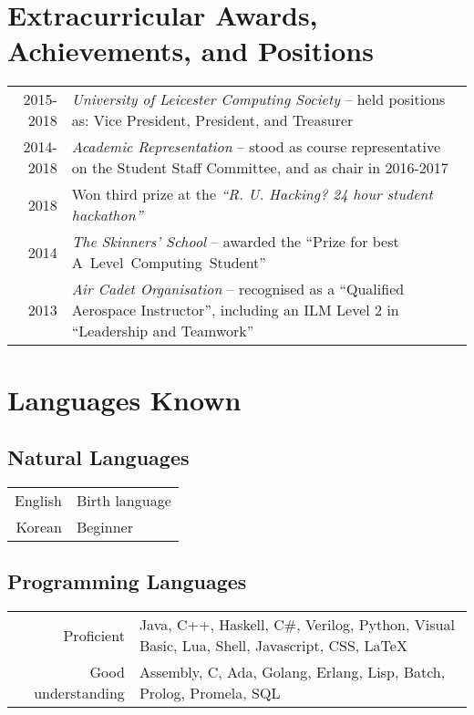 \documentclass[a4paper]{article}
\begin{document}
\section*{Extracurricular Awards, Achievements, and Positions}
\begin{tabular}{rp{11.75cm}}
  2015-2018 & \emph{University of Leicester Computing Society} -- held positions as: Vice President, President, and Treasurer \\
  2014-2018 & \emph{Academic Representation} -- stood as course representative on the Student Staff Committee, and as chair in 2016-2017 \\
  2018 & Won third prize at the \emph{``R. U. Hacking? 24 hour student hackathon''} \\
  2014 & \emph{The Skinners' School} -- awarded the ``Prize for best A~Level~Computing~Student'' \\
  2013 & \emph{Air Cadet Organisation} -- recognised as a ``Qualified Aerospace Instructor'', including an ILM Level 2 in ``Leadership and Teamwork''
\end{tabular}

\section*{Languages Known}
\subsection*{Natural Languages}
\begin{tabular}{rl}
  English & Birth language \\
  Korean & Beginner
\end{tabular}
\subsection*{Programming Languages}
\begin{tabular}{r|p{11.75cm}}
  Proficient & Java, C++, Haskell, C\#, Verilog, Python, Visual Basic, Lua, Shell, Javascript, CSS, LaTeX \\
  Good understanding & Assembly, C, Ada, Golang, Erlang, Lisp, Batch, Prolog, Promela, SQL
\end{tabular}
\end{document}
